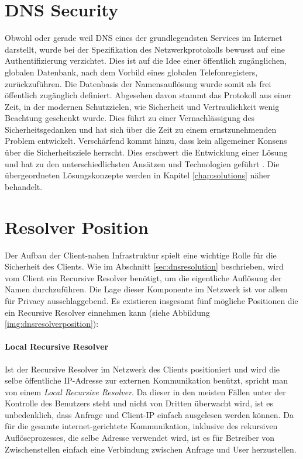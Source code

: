 \section{DNS Security}
\label{sec:dnssecurity}
Obwohl oder gerade weil DNS eines der grundlegendsten Services im Internet darstellt, wurde bei der Spezifikation des Netzwerkprotokolls bewusst auf eine Authentifizierung verzichtet. Dies ist auf die Idee einer öffentlich zugänglichen, globalen Datenbank, nach dem Vorbild eines globalen Telefonregisters, zurückzuführen. Die Datenbasis der Namensauflösung wurde somit als frei öffentlich zugänglich definiert. Abgesehen davon stammt das Protokoll aus einer Zeit, in der modernen Schutzzielen, wie Sicherheit und Vertraulichkeit wenig Beachtung geschenkt wurde. Dies führt zu einer Vernachlässigung des Sicherheitsgedanken und hat sich über die Zeit zu einem ernstzunehmenden Problem entwickelt. Verschärfend kommt hinzu, dass kein allgemeiner Konsens über die Sicherheitsziele herrscht. Dies erschwert die Entwicklung einer Lösung und hat zu den unterschiedlichsten Ansätzen und Technologien geführt \cite{Grothoff2018}. Die übergeordneten Lösungskonzepte werden in Kapitel \ref{chap:solutions} näher behandelt.

\section{Resolver Position}
\label{sec:dnsresolverposition}
Der Aufbau der Client-nahen Infrastruktur spielt eine wichtige Rolle für die Sicherheit des Clients. Wie im Abschnitt \ref{sec:dnsresolution} beschrieben, wird vom Client ein Recursive Resolver benötigt, um die eigentliche Auflösung der Namen durchzuführen. Die Lage dieser Komponente im Netzwerk ist vor allem für Privacy ausschlaggebend. Es existieren insgesamt fünf mögliche Positionen die ein Recursive Resolver einnehmen kann\cite{VanHeugten2018} (siehe Abbildung \ref{img:dnsresolverposition}):

\paragraph{Local Recursive Resolver}
Ist der Recursive Resolver im Netzwerk des Clients positioniert und wird die selbe öffentliche IP-Adresse zur externen Kommunikation benützt, spricht man von einem \textit{Local Recursive Resolver}. Da dieser in den meisten Fällen unter der Kontrolle des Benutzers steht und nicht von Dritten überwacht wird, ist es unbedenklich, dass Anfrage und Client-IP einfach ausgelesen werden können. Da für die gesamte internet-gerichtete Kommunikation, inklusive des rekursiven Auflöseprozesses, die selbe Adresse verwendet wird, ist es für Betreiber von Zwischenstellen einfach eine Verbindung zwischen Anfrage und User herzustellen\cite{Shulman2014}.

